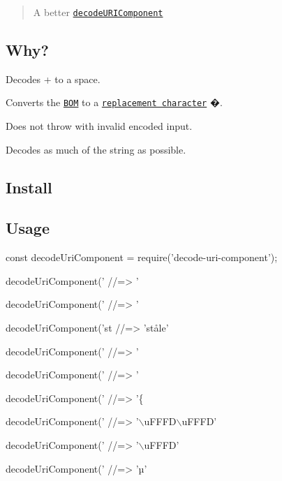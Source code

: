 \href{https://travis-ci.org/SamVerschueren/decode-uri-component}{\tt } \href{https://coveralls.io/github/SamVerschueren/decode-uri-component?branch=master}{\tt }

\begin{quote}
A better \href{https://developer.mozilla.org/en/docs/Web/JavaScript/Reference/Global_Objects/decodeURIComponent}{\tt decode\+U\+R\+I\+Component} \end{quote}


\subsection*{Why?}


\begin{DoxyItemize}
\item Decodes {\ttfamily +} to a space.
\item Converts the \href{https://en.wikipedia.org/wiki/Byte_order_mark}{\tt B\+OM} to a \href{https://en.wikipedia.org/wiki/Specials_(Unicode_block)#Replacement_character}{\tt replacement character} {\ttfamily �}.
\item Does not throw with invalid encoded input.
\item Decodes as much of the string as possible.
\end{DoxyItemize}

\subsection*{Install}




\subsection*{Usage}


\begin{DoxyCode}
const decodeUriComponent = require('decode-uri-component');

decodeUriComponent('%
//=> '%

decodeUriComponent('%
//=> '%

decodeUriComponent('st%
//=> 'ståle'

decodeUriComponent('%
//=> '%

decodeUriComponent('%
//=> '%

decodeUriComponent('%
//=> '\{%

decodeUriComponent('%
//=> '\(\backslash\)uFFFD\(\backslash\)uFFFD'

decodeUriComponent('%
//=> '\(\backslash\)uFFFD'

decodeUriComponent('%
//=> 'µ'
\end{DoxyCode}


